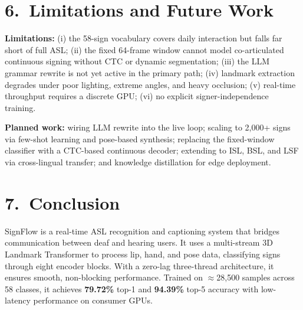 \documentclass[10pt, twocolumn]{article}
\begin{document}
\section*{6.~Limitations and Future Work}
\textbf{Limitations:} (i) the 58-sign vocabulary covers daily interaction but falls far short of full ASL; (ii) the fixed 64-frame window cannot model co-articulated continuous signing without CTC or dynamic segmentation; (iii) the LLM grammar rewrite is not yet active in the primary path; (iv) landmark extraction degrades under poor lighting, extreme angles, and heavy occlusion; (v) real-time throughput requires a discrete GPU; (vi) no explicit signer-independence training.

\textbf{Planned work:} wiring LLM rewrite into the live loop; scaling to 2,000+ signs via few-shot learning and pose-based synthesis; replacing the fixed-window classifier with a CTC-based continuous decoder; extending to ISL, BSL, and LSF via cross-lingual transfer; and knowledge distillation for edge deployment.

\section*{7.~Conclusion}

SignFlow is a real-time ASL recognition and captioning system that bridges communication between deaf and hearing users. It uses a multi-stream 3D Landmark Transformer to process lip, hand, and pose data, classifying signs through eight encoder blocks. With a zero-lag three-thread architecture, it ensures smooth, non-blocking performance. Trained on $\approx$28{,}500 samples across 58 classes, it achieves \textbf{79.72\%} top-1 and \textbf{94.39\%} top-5 accuracy with low-latency performance on consumer GPUs.
\end{document}
